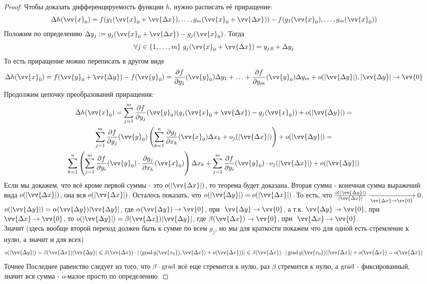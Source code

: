 \begin{proof}
	Чтобы доказать дифференцируемость функции $h$, нужно расписать её приращение:
	\[
		\Delta h(\vv{x}_0) = f(g_1(\vv{x}_0 + \vv{\Delta x}), \ldots, g_m(\vv{x}_0 + \vv{\Delta x})) - f(g_1(\vv{x}_0), \ldots, g_m(\vv{x}_0))
	\]
	Положим по определению $\Delta y_j := g_j(\vv{x}_0 + \vv{\Delta x}) - g_j(\vv{x}_0)$. Тогда
	\[
		\forall j \in \range{m}\ g_j(\vv{x}_0 + \vv{\Delta x}) = y_{j, 0} + \Delta y_j
	\]
	То есть приращение можно переписать в другом виде
	\[
		\Delta h(\vv{x}_0) = f(\vv{y}_0 + \vv{\Delta y}) - f(\vv{y}_0) = \frac{\vdelta f}{\vdelta y_1} (\vv{y}_0) \Delta y_1 + \ldots + \frac{\vdelta f}{\vdelta y_m} (\vv{y}_0) \Delta y_m + o(|\vv{\Delta y}|), |\vv{\Delta y}| \to \vv{0}
	\]
	Продолжим цепочку преобразований приращения:
	\begin{multline*}
		\Delta h(\vv{x}_0) = \suml_{j = 1}^m \pd{f}{y_j}(\vv{y}_0) (g_j(\vv{x}_0 + \vv{\Delta x}) - g_j(\vv{x}_0)) + o(|\vv{\Delta y}|) =
		\\
		\suml_{j = 1}^m \frac{\vdelta f}{\vdelta y_j} (\vv{y}_0) \left(\suml_{k = 1}^n \frac{\vdelta g_j}{\vdelta x_k} (\vv{x}_0) \Delta x_k + o_j(|\vv{\Delta x}|)\right) + o(|\vv{\Delta y}|) =
		\\
		\suml_{k = 1}^n \left(\suml_{j = 1}^m \frac{\vdelta f}{\vdelta y_i} (\vv{y}_0) \cdot \frac{\vdelta g_j}{\vdelta x_k} (\vv{x}_0)\right) \Delta x_k + \suml_{j = 1}^m \frac{\vdelta f}{\vdelta y_i} (\vv{y}_0) \cdot o_j(|\vv{\Delta x}|) + o(|\vv{\Delta y}|)
	\end{multline*}
	Если мы докажем, что всё кроме первой суммы  - это $o(|\vv{\Delta x}|)$, то теорема будет доказана. Вторая сумма - конечная сумма выражений вида $o(|\vv{\Delta x}|)$, она вся $o(|\vv{\Delta x}|)$. Осталось показать, что $o(|\vv{\Delta y}|) = o(|\vv{\Delta x}|)$. То есть, что $\frac{o(|\vv{\Delta y}|)}{|\vv{\Delta x}|} \xrightarrow[\vv{\Delta x} \to \vv{0}]{} 0$. $ o(|\vv{\Delta y}|) = \alpha(\vv{\Delta y})|\vv{\Delta y}|$,  где
	$\alpha( \vv{\Delta y}) \to \vv{0}$, при
	 $\ \vv{\Delta y} \to \vv{0}$, а т.к. $\vv{\Delta y} \to \vv{0}$, при $ \vv{\Delta x} \to \vv{0}$, то $ o(|\vv{\Delta y}|) = \beta(\vv{\Delta x})|\vv{\Delta y}|$,  где
	 $\beta( \vv{\Delta x}) \to \vv{0}$, при
	 $\ \vv{\Delta x} \to \vv{0}$. \\
	 Значит (здесь вообще второй переход должен быть к сумме по всем $g_j$, но мы для краткости покажем что для одной есть стремление к нулю, а значит и для всех)
	 \[
	 	o(|\vv{\Delta y}|) = \beta(\vv{\Delta x})|\vv{\Delta y}| \leq \beta(\vv{\Delta x}) \cdot | \trbr{\grad g(\vv{x_0}), \vv{\Delta x}} + o(\vv{\Delta x}))| \le \beta(\vv{\Delta x}) \cdot | \grad g(\vv{x_0})||\vv{\Delta x}| + o(\vv{\Delta x}) = o(\vv{\Delta x})
	 \]
	 Точнее 
	 Последнее равенство следует из того, что $\beta \cdot \operatorname{grad}$ всё еще стремится к нулю, раз $\beta$ стремится к нулю, а $\operatorname{grad}$ - фиксированный, значит вся сумма - $o$-малое просто по определению. 
\end{proof}


